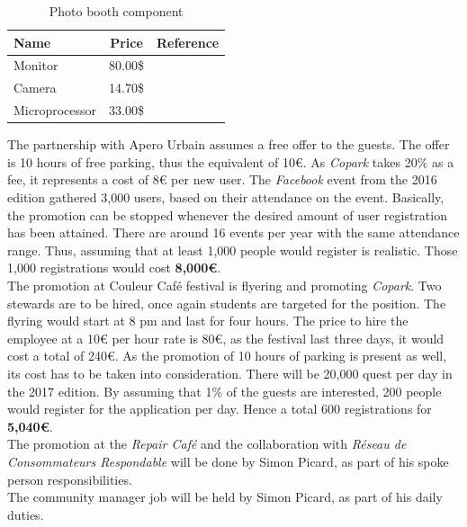 \documentclass[12pt,a4paper,oneside]{book}
\newcommand{\bp}{\textit{Copark}}
\begin{document}
\begin{table}[h]
\centering
\caption{Photo booth component}
\label{pbcom}
\begin{tabular}{|l|c|c|}
\hline
\textbf{Name}   & \textbf{Price} & \textbf{Reference} \\ \hline
Monitor         & 80.00\$         & \cite{abmon}    \\ \hline
Camera          & 14.70\$         & \cite{abcam}     \\ \hline
Microprocessor & 33.00\$         & \cite{abmc}     \\ \hline
\end{tabular}
\end{table}

The partnership with Apero Urbain assumes a free offer to the guests. The offer is 10 hours of free parking, thus the equivalent of 10\euro{}. As \bp{} takes 20\% as a fee, it represents a cost of 8\euro{} per new user. The \textit{Facebook} event from the 2016 edition gathered 3,000 users, based on their attendance on the event.\cite{fbau} Basically, the promotion can be stopped whenever the desired amount of user registration has been attained. There are around 16 events per year with the same attendance range. Thus, assuming that at least 1,000 people would register is realistic. Those 1,000 registrations would cost \textbf{8,000\euro{}}.\\


The promotion at Couleur Café festival is flyering and promoting \bp{}. Two stewards are to be hired, once again students are targeted for the position. The flyring would start at 8 pm and last for four hours. The price to hire the employee at a 10\euro{} per hour rate is 80\euro{}, as the festival last three days, it would cost a total of 240\euro{}. As the promotion of 10 hours of parking is present as well, its cost has to be taken into consideration. There will be 20,000 quest per day in the 2017 edition. By assuming that 1\% of the guests are interested, 200 people would register for the application per day. Hence a total 600 registrations for \textbf{5,040\euro{}}.\\

The promotion at the \textit{Repair Café} and the collaboration with \textit{Réseau de Consommateurs Respondable} will be done by Simon Picard, as part of his spoke person responsibilities.\\

The community manager job will be held by Simon Picard, as part of his daily duties.\\
\end{document}
